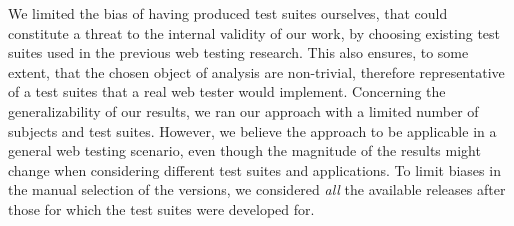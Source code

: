 \label{sec:ttv}
We limited the bias of having produced test suites ourselves, that could constitute a threat to the internal validity of our work, by choosing existing test suites used in the previous web testing research. This also ensures, to some extent, that the chosen object of analysis are non-trivial, therefore representative of a test suites that a real web tester would implement. 
%
Concerning the generalizability of our results, we ran our approach with a limited number of subjects and test suites. However, we believe the approach to be applicable in a general web testing scenario, even though the magnitude of the results might change when considering different test suites and applications. To limit biases in the manual selection of the versions, we considered \textit{all} the available releases after those for which the test suites were developed for.